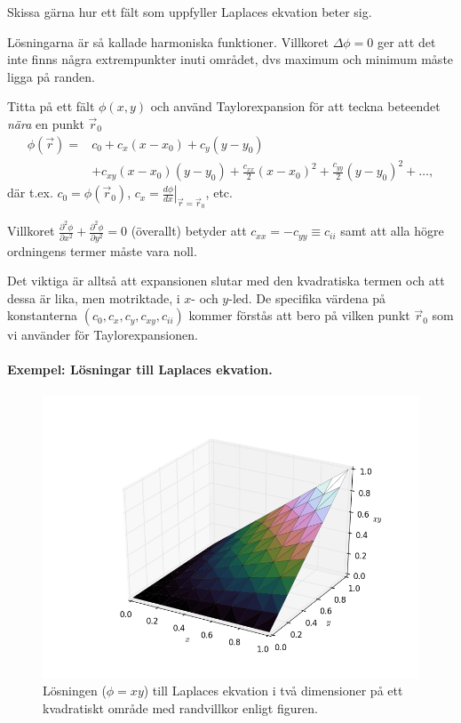 \documentclass[%
oneside,                 %
final,                   %
10pt]{article}
\newenvironment{warning_mdfboxadmon}[1][]{
\begin{warning_mdfboxmdframed}[frametitle=#1]
}
{
\end{warning_mdfboxmdframed}
}
\begin{document}
\begin{warning_mdfboxadmon}[Rita]
Skissa gärna hur ett fält som uppfyller Laplaces ekvation beter sig. 

Lösningarna är så kallade harmoniska funktioner. Villkoret $\Delta \phi = 0$ ger att det inte finns några extrempunkter inuti området, dvs maximum och minimum måste ligga på randen.

Titta på ett fält $\phi(x,y)$ och använd Taylorexpansion för att teckna beteendet \emph{nära} en punkt $\vec{r}_0$
\begin{align*}
\phi(\vec{r}) =  &c_0 + c_x (x-x_0) + c_y (y-y_0) \\
&+ c_{xy} (x-x_0)(y-y_0)+ \frac{c_{xx}}{2}(x-x_0)^2 + \frac{c_{yy}}{2}(y-y_0)^2 +\ldots,
\end{align*}
där t.ex. $c_0 = \phi(\vec{r}_0)$, $c_x = \left. \frac{d\phi}{dx} \right|_{\vec{r} = \vec{r}_0}$, etc. 

Villkoret $\frac{\partial^2\phi}{\partial x^2} + \frac{\partial^2\phi}{\partial y^2} = 0$ (överallt) betyder att $c_{xx} = -c_{yy}\equiv c_{ii}$ samt att alla högre ordningens termer måste vara noll. 

Det viktiga är alltså att expansionen slutar med den kvadratiska termen och att dessa är lika, men motriktade, i $x$- och $y$-led. De specifika värdena på konstanterna $(c_0, c_x, c_y,c_{xy},c_{ii})$ kommer förstås att bero på vilken punkt $\vec{r}_0$ som vi använder för Taylorexpansionen.
\end{warning_mdfboxadmon} %



\paragraph{Exempel: Lösningar till Laplaces ekvation.}
\begin{figure}[!ht]  %
  \centerline{\includegraphics[width=0.8\linewidth]{fig/xy.png}}
  \caption{
  Lösningen ($\phi = xy$) till Laplaces ekvation i två dimensioner på ett kvadratiskt område med randvillkor enligt figuren. \label{fig:xy}
  }
\end{figure}
\end{document}
